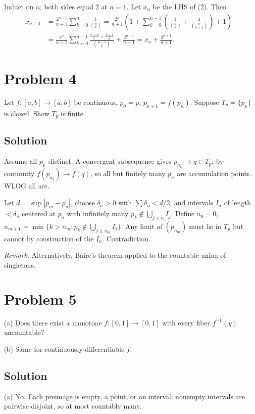 \documentclass{article}
\begin{document}
Induct on $n$; both sides equal $2$ at $n=1$. Let $x_n$ be the LHS of (2). Then
\begin{align*}
x_{n+1} &= \frac{2^{n+1}}{n+1}\sum_{k=0}^n \frac{1}{\binom{n}{k}} = \frac{2^n}{n+1}\left(1 + \sum_{k=0}^{n-1}\left(\frac{1}{\binom{n}{k}} + \frac{1}{\binom{n}{k+1}}\right) + 1\right)\\
&= \frac{2^n}{n+1}\sum_{k=0}^{n-1}\frac{\frac{n-k}{n}+\frac{k+1}{n}}{\binom{n-1}{k}} + \frac{2^{n+1}}{n+1} = x_n + \frac{2^{n+1}}{n+1}.
\end{align*}

\section*{Problem 4}
Let $f:[a,b]\to[a,b]$ be continuous, $p_0=p$, $p_{n+1}=f(p_n)$. Suppose $T_p=\{p_n\}$ is closed. Show $T_p$ is finite.

\subsection*{Solution}
Assume all $p_n$ distinct. A convergent subsequence gives $p_{n_k}\to q\in T_p$; by continuity $f(p_{n_k})\to f(q)$, so all but finitely many $p_n$ are accumulation points. WLOG all are.

Let $d=\sup|p_m-p_n|$, choose $\delta_n>0$ with $\sum\delta_n < d/2$, and intervals $I_n$ of length $<\delta_n$ centered at $p_n$ with infinitely many $p_k\notin\bigcup_{j\le n}I_j$. Define $n_0=0$, $n_{m+1}=\min\{k>n_m:p_k\notin\bigcup_{j\le n_m}I_j\}$. Any limit of $(p_{n_m})$ must lie in $T_p$ but cannot by construction of the $I_n$. Contradiction.

\textit{Remark.} Alternatively, Baire's theorem applied to the countable union of singletons.

\section*{Problem 5}
(a) Does there exist a monotone $f:[0,1]\to[0,1]$ with every fiber $f^{-1}(y)$ uncountable?

(b) Same for continuously differentiable $f$.

\subsection*{Solution}
(a) No. Each preimage is empty, a point, or an interval; nonempty intervals are pairwise disjoint, so at most countably many.
\end{document}
